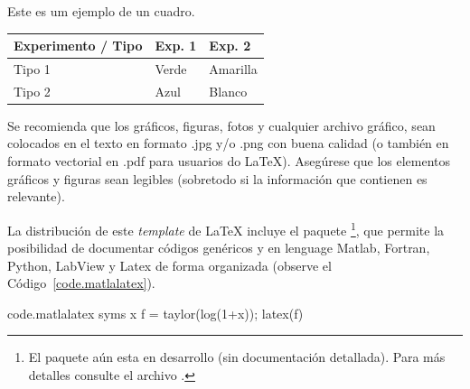\documentclass[12pt, a4paper, twoside, twocolumn]{article}
\begin{document}
\begin{quadro}[ht!]
  \centering {} \setlength\aboverulesep{0pt} \setlength\belowrulesep{0pt}
  \caption{Este es um ejemplo de un cuadro.}
	\fontsize{11}{12}\selectfont 
    \begin{tabular}{| C{2.8cm} | C{1.8cm} | C{1.8cm} |}
    \hline
    \textbf{ Experimento / Tipo } & \textbf{Exp. 1} & \textbf{Exp. 2}\\
	\midrule
		Tipo 1& Verde & Amarilla\\
		 Tipo 2 & Azul & Blanco\\
		\hline
    \end{tabular}
    \label{quad.exemplo}%
\end{quadro}%



Se recomienda que los gráficos, figuras, fotos y cualquier archivo gráfico, sean colocados en el texto en formato .jpg y/o .png con buena calidad (o también en formato vectorial en .pdf para usuarios do \LaTeX\xspace). Asegúrese que los elementos gráficos y figuras sean legibles (sobretodo si la información que contienen es relevante).

La distribución de este \textit{template} de \LaTeX\xspace incluye el paquete \footnote{El paquete aún esta en desarrollo (sin documentación detallada). Para más detalles consulte el archivo .}, que permite la posibilidad de documentar códigos genéricos y en lenguage Matlab, Fortran, Python, LabView y Latex de forma organizada (observe el Código~\ref{code.matlalatex}).

\begin{matlabcode}{code.matlalatex}
  syms x
  f = taylor(log(1+x));
  latex(f)
\end{matlabcode}
\end{document}
